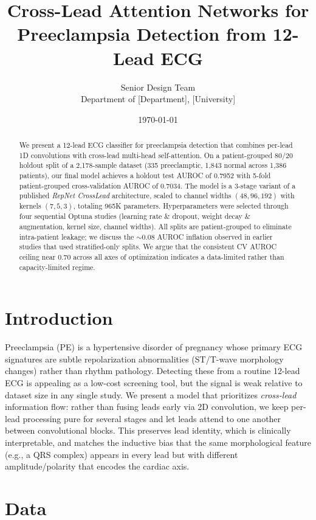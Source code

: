 \documentclass[11pt]{article}
\title{Cross-Lead Attention Networks for Preeclampsia Detection from 12-Lead ECG}
\author{Senior Design Team\\\small Department of [Department], [University]}
\date{\today}
\begin{document}
\maketitle

\begin{abstract}
We present a 12-lead ECG classifier for preeclampsia detection that combines per-lead 1D convolutions with cross-lead multi-head self-attention. On a patient-grouped 80/20 holdout split of a 2,178-sample dataset (335 preeclamptic, 1,843 normal across 1,386 patients), our final model achieves a holdout test AUROC of 0.7952 with 5-fold patient-grouped cross-validation AUROC of 0.7034. The model is a 3-stage variant of a published \emph{RepNet CrossLead} architecture, scaled to channel widths $(48, 96, 192)$ with kernels $(7, 5, 3)$, totaling 965K parameters. Hyperparameters were selected through four sequential Optuna studies (learning rate \& dropout, weight decay \& augmentation, kernel size, channel widths). All splits are patient-grouped to eliminate intra-patient leakage; we discuss the $\sim$0.08 AUROC inflation observed in earlier studies that used stratified-only splits. We argue that the consistent CV AUROC ceiling near 0.70 across all axes of optimization indicates a data-limited rather than capacity-limited regime.
\end{abstract}

\section{Introduction}

Preeclampsia (PE) is a hypertensive disorder of pregnancy whose primary ECG signatures are subtle repolarization abnormalities (ST/T-wave morphology changes) rather than rhythm pathology. Detecting these from a routine 12-lead ECG is appealing as a low-cost screening tool, but the signal is weak relative to dataset size in any single study. We present a model that prioritizes \emph{cross-lead} information flow: rather than fusing leads early via 2D convolution, we keep per-lead processing pure for several stages and let leads attend to one another between convolutional blocks. This preserves lead identity, which is clinically interpretable, and matches the inductive bias that the same morphological feature (e.g., a QRS complex) appears in every lead but with different amplitude/polarity that encodes the cardiac axis.

\section{Data}
\end{document}
